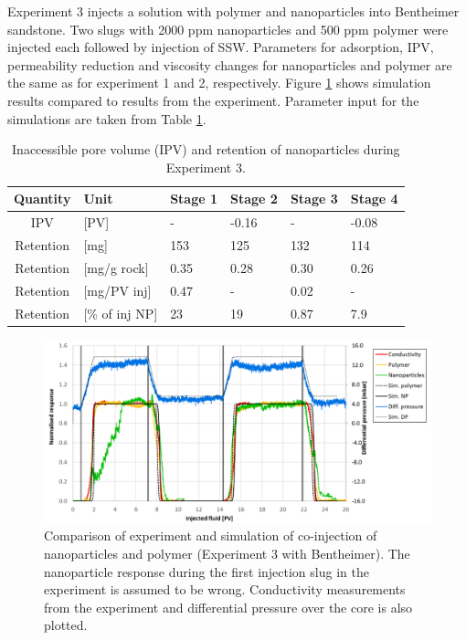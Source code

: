 \documentclass[journal = enfuem, manuscript =  article]{achemso}
\begin{document}
Experiment 3 injects a solution with polymer and nanoparticles into Bentheimer sandstone. Two slugs with 2000 ppm nanoparticles and 500 ppm polymer were injected each followed by injection of SSW. Parameters for adsorption, IPV, permeability reduction and viscosity changes for nanoparticles and polymer are the same as for experiment 1 and 2, respectively. Figure \ref{cht:simExpNP3} shows simulation results compared to results from the experiment. Parameter input for the simulations are taken from Table \ref{tab:ipvexp3}.

\begin{table} 
\small
\centering
\caption{Inaccessible pore volume (IPV) and retention of nanoparticles during Experiment 3.}
\label{tab:ipvexp3}
\begin{tabular}{c l l l l l } 
\toprule
\textbf{Quantity} & \textbf{Unit} & \textbf{Stage 1} & \textbf{Stage 2} & \textbf{Stage 3} & \textbf{Stage 4} \\ 
\midrule 
IPV         & [PV]          & -         & -0.16     & -         & -0.08     \\
Retention   & [mg]          & 153       & 125       & 132       & 114       \\ 
Retention   & [mg/g rock]   & 0.35      & 0.28     & 0.30     & 0.26     \\ 
Retention   & [mg/PV inj]   & 0.47      & -         & 0.02      & -         \\
Retention   & [\% of inj NP]& 23        & 19       & 0.87       & 7.9       \\ 
\bottomrule
\end{tabular}
\end{table}

\begin{figure}[h]
    \centering
    \includegraphics[width=\textwidth]{fig/simExpNP3.png}
    \caption{Comparison of experiment and simulation of co-injection of nanoparticles and polymer (Experiment 3 with Bentheimer). The nanoparticle response during the first injection slug in the experiment is assumed to be wrong. Conductivity measurements from the experiment and differential pressure over the core is also plotted.}
    \label{cht:simExpNP3}
\end{figure}
\end{document}
